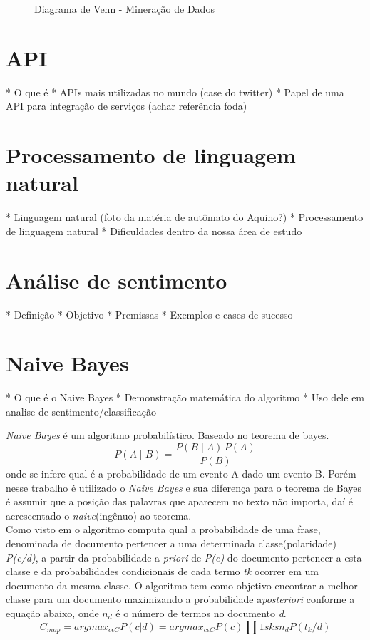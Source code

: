 \begin{figure}[ht]
	\centering{}
	\caption{Diagrama de Venn - Mineração de Dados}
	\label{uni}
\end{figure} 

\section{API}\label{sec:api}
* O que é
* APIs mais utilizadas no mundo (case do twitter)
* Papel de uma API para integração de serviços (achar referência foda)

\section{Processamento de linguagem natural}\label{sec:nlp}
* Linguagem natural (foto da matéria de autômato do Aquino?)
* Processamento de linguagem natural
* Dificuldades dentro da nossa área de estudo

\section{Análise de sentimento}\label{sec:analise_sentimento}
* Definição
* Objetivo
* Premissas
* Exemplos e cases de sucesso


\section{Naive Bayes}\label{sec:naive_bayes}
* O que é o Naive Bayes
* Demonstração matemática do algoritmo
* Uso dele em analise de sentimento/classificação


\emph{Naive Bayes} é um algoritmo probabilístico. Baseado no teorema de bayes. $$ P(A \mid B) = \frac{P(B \mid A) \, P(A)}{P(B)} $$ onde se infere qual é a probabilidade de um evento A dado um evento B. Porém nesse trabalho é utilizado o \emph{Naive Bayes} e sua diferença para o teorema de Bayes é assumir que a posição das palavras que aparecem no texto não importa, daí é acrescentado o \emph{naive}(ingênuo) ao teorema.
\\ Como visto em \cite{lucca2013implementaccao} o algoritmo computa qual a probabilidade de uma frase, denominada de documento pertencer a uma determinada classe(polaridade) \emph{P(c/d)}, a partir da probabilidade a \emph{priori} de \emph{P(c)} do documento pertencer a esta classe e da probabilidades condicionais de cada termo \emph{tk} ocorrer em um documento da mesma classe. O algoritmo tem como objetivo encontrar a melhor classe para um documento maximizando a probabilidade a\emph{posteriori} conforme a equação abaixo, onde $ n_{d} $ é o número de termos no documento \emph{d}. $$ C_{map}= argmax_{c \epsilon C}P(c|d)=argmax_{c \epsilon C}P(c)\prod 1sksn_{d}P(t_{k}/d) $$